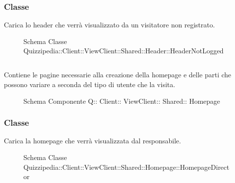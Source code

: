 \subsubsection{Classe }
Carica lo header che verrà visualizzato da un visitatore non registrato.
\begin{figure}[H]
\centering
\noindent{}
\caption[Schema Classe HeaderNotLogged]{Schema Classe Quizzipedia::Client::ViewClient::Shared::Header::HeaderNotLogged}
\end{figure}
\subsection{}
Contiene le pagine necessarie alla creazione della homepage e delle parti che possono variare a seconda del tipo di utente che la visita.
\begin{figure}[H]
\centering
\noindent{}
\caption[Schema Componente Quizzipedia::Client::ViewClient::Shared::Homepage]{Schema Componente Q:: Client:: ViewClient:: Shared:: Homepage}
\end{figure}
\subsubsection{Classe }
Carica la homepage che verrà visualizzata dal responsabile.
\begin{figure}[H]
\centering
\noindent{}
\caption[Schema Classe HomepageDirector]{Schema Classe Quizzipedia::Client::ViewClient::Shared::Homepage::HomepageDirector}
\end{figure}

